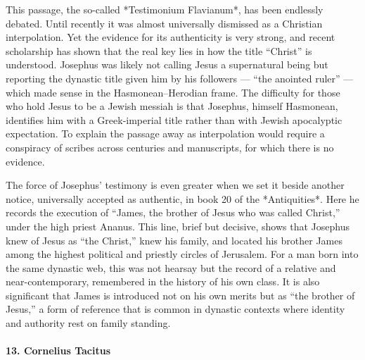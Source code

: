 This passage, the so-called *Testimonium Flavianum*, has been endlessly debated.
Until recently it was almost universally dismissed as a Christian interpolation.
Yet the evidence for its authenticity is very strong, and recent scholarship has shown that the real key lies in how the title “Christ” is understood.
Josephus was likely not calling Jesus a supernatural being but reporting the dynastic title given him by his followers — “the anointed ruler” — which made sense in the Hasmonean–Herodian frame.
The difficulty for those who hold Jesus to be a Jewish messiah is that Josephus, himself Hasmonean, identifies him with a Greek-imperial title rather than with Jewish apocalyptic expectation.
To explain the passage away as interpolation would require a conspiracy of scribes across centuries and manuscripts, for which there is no evidence.

The force of Josephus’ testimony is even greater when we set it beside another notice, universally accepted as authentic, in book 20 of the *Antiquities*.
Here he records the execution of “James, the brother of Jesus who was called Christ,” under the high priest Ananus.
This line, brief but decisive, shows that Josephus knew of Jesus as “the Christ,” knew his family, and located his brother James among the highest political and priestly circles of Jerusalem.
For a man born into the same dynastic web, this was not hearsay but the record of a relative and near-contemporary, remembered in the history of his own class.
It is also significant that James is introduced not on his own merits but as “the brother of Jesus,” a form of reference that is common in dynastic contexts where identity and authority rest on family standing.

\paragraph{13.
Cornelius Tacitus}\label{par:cornelius-tacitus}

